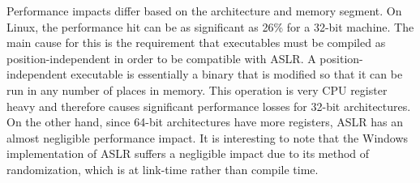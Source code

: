 Performance impacts differ based on the architecture and memory segment. On Linux, the performance hit can be as significant as 26\% for a 32-bit machine. \cite{payer2012too} The main cause for this is the requirement that executables must be compiled as position-independent in order to be compatible with ASLR. A position-independent executable is essentially a binary that is modified so that it can be run in any number of places in memory. This operation is very CPU register heavy and therefore causes significant performance losses for 32-bit architectures. On the other hand, since 64-bit architectures have more registers, ASLR has an almost negligible performance impact. It is interesting to note that the Windows implementation of ASLR suffers a negligible impact due to its method of randomization, which is at link-time rather than compile time.
